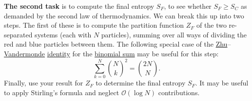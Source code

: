 \documentclass[12 pt]{article} %
\begin{document}
\textbf{The second task} is to compute the final entropy $S_F$, to see whether $S_F \geq S_C$ as demanded by the second law of thermodynamics.
We can break this up into two steps.
The first of these is to compute the partition function $Z_F$ of the two re-separated systems (each with $N$ particles), summing over all ways of dividing the red and blue particles between them.
The following special case of the \href{https://en.wikipedia.org/wiki/Zhu_Shijie}{Zhu}--\href{https://en.wikipedia.org/wiki/Alexandre-Theophile_Vandermonde}{Vandermonde} \href{https://en.wikipedia.org/wiki/Vandermonde's_identity}{identity} for the \href{https://mathworld.wolfram.com/BinomialSums.html}{binomial sum} may be useful for this step:
\begin{equation*}
  \sum_{k = 0}^N \binom{N}{k}^2 = \binom{2N}{N}.
\end{equation*}
Finally, use your result for $Z_F$ to determine the final entropy $S_F$.
It may be useful to apply Stirling's formula and neglect $\mathcal O\left(\log N\right)$ contributions.
\end{document}
